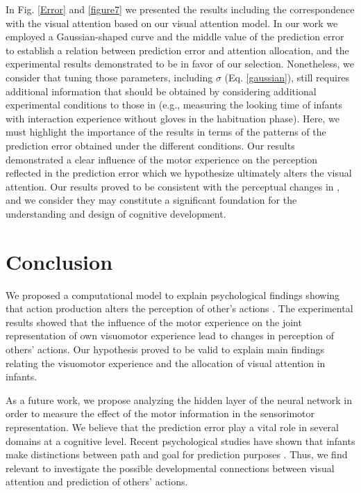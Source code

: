 \documentclass[conference]{IEEEtran}
\begin{document}
In Fig. \ref{Error} and \ref{figure7} we presented the results including the correspondence with the visual attention based on our visual attention model. In our work we employed a Gaussian-shaped curve and the middle value of the prediction error to establish a relation between prediction error and attention allocation, and the experimental results demonstrated to be in favor of our selection. Nonetheless, we consider that tuning those parameters, including \(\sigma\) (Eq. \ref{gaussian}), still requires additional information that should be obtained by considering additional experimental conditions to those in \cite{sommerville2005action} (e.g., measuring the looking time of infants with interaction experience without gloves in the habituation phase). Here, we must highlight the importance of the results in terms of the patterns of the prediction error obtained under the different conditions. Our results demonstrated a clear influence of the motor experience on the perception reflected in the prediction error which we hypothesize ultimately alters the visual attention. Our results proved to be consistent with the perceptual changes in \cite{sommerville2005action}, and we consider they may constitute a significant foundation for the understanding and design of cognitive development.

\section{Conclusion}
We proposed a computational model to explain psychological findings showing that action production alters the perception of other's actions \cite{sommerville2005action}. The experimental results showed that the influence of the motor experience on the joint representation of own visuomotor experience lead to changes in perception of others' actions. Our hypothesis proved to be valid to explain main findings relating the visuomotor experience and the allocation of visual attention in infants.

As a future work, we propose analyzing the hidden layer of the neural network in order to measure the effect of the motor information in the sensorimotor representation. We believe that the prediction error play a vital role in several domains at a cognitive level. Recent psychological studies have shown that infants make distinctions between path and goal for prediction purposes \cite{cannon2012infants}. Thus, we find relevant to investigate the possible developmental connections between visual attention and prediction of others' actions.
\end{document}
